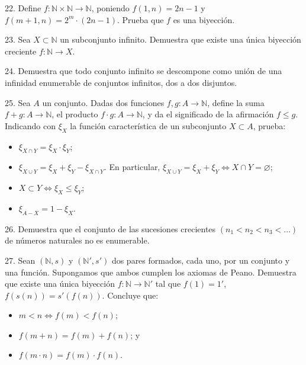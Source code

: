 \documentclass[12pt,oneside]{book}
\begin{document}
22. Define \( f: \mathbb{N} \times \mathbb{N} \to \mathbb{N} \), poniendo \( f(1,n) = 2n - 1 \) y \( f(m+1,n) = 2^m \cdot (2n - 1) \). Prueba que \( f \) es una biyección.

23. Sea \( X \subset \mathbb{N} \) un subconjunto infinito. Demuestra que existe una única biyección creciente \( f: \mathbb{N} \to X \).

24. Demuestra que todo conjunto infinito se descompone como unión de una infinidad enumerable de conjuntos infinitos, dos a dos disjuntos.

25. Sea \( A \) un conjunto. Dadas dos funciones \( f, g: A \to \mathbb{N} \), define la suma \( f+g: A \to \mathbb{N} \), el producto \( f \cdot g: A \to \mathbb{N} \), y da el significado de la afirmación \( f \leq g \). Indicando con \( \xi_X \) la función característica de un subconjunto \( X \subset A \), prueba:
\begin{itemize}
    \item[a)] \( \xi_{X \cap Y} = \xi_X \cdot \xi_Y \);  
    \item[b)] \( \xi_{X \cup Y} = \xi_X + \xi_Y - \xi_{X \cap Y} \). En particular, \( \xi_{X \cup Y} = \xi_X + \xi_Y \Leftrightarrow X \cap Y = \varnothing \);
    \item[c)] \( X \subset Y \Leftrightarrow \xi_X \leq \xi_Y \);
    \item[d)] \( \xi_{A-X} = 1 - \xi_X \).
\end{itemize}

26. Demuestra que el conjunto de las sucesiones crecientes \( (n_1 < n_2 < n_3 < \ldots) \) de números naturales no es enumerable.

27. Sean \( (\mathbb{N}, s) \) y \( (\mathbb{N}', s') \) dos pares formados, cada uno, por un conjunto y una función. Supongamos que ambos cumplen los axiomas de Peano. Demuestra que existe una única biyección \( f: \mathbb{N} \to \mathbb{N}' \) tal que \( f(1) = 1' \), \( f(s(n)) = s'(f(n)) \). Concluye que:
\begin{itemize}
    \item[a)] \( m < n \Leftrightarrow f(m) < f(n) \);
    \item[b)] \( f(m+n) = f(m) + f(n) \); y
    \item[c)] \( f(m \cdot n) = f(m) \cdot f(n) \).
\end{itemize}
\end{document}
